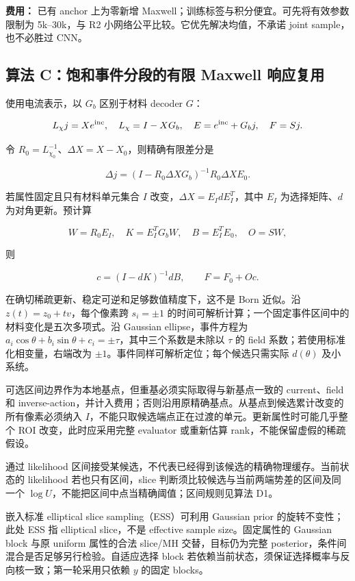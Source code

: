 \documentclass[
  11pt,
  a4paper,
]{article}
\begin{document}
\textbf{费用：} 已有 anchor 上为零新增
Maxwell；训练标签与积分便宜。可先将有效参数限制为 5k--30k，与 R2
小网络公平比较。它优先解决均值，不承诺 joint sample，也不必胜过 CNN。

\hypertarget{ux7b97ux6cd5-cux9971ux548cux4e8bux4ef6ux5206ux6bb5ux7684ux6709ux9650-maxwell-ux54cdux5e94ux590dux7528}{%
\subsection{算法 C：饱和事件分段的有限 Maxwell
响应复用}\label{ux7b97ux6cd5-cux9971ux548cux4e8bux4ef6ux5206ux6bb5ux7684ux6709ux9650-maxwell-ux54cdux5e94ux590dux7528}}

使用电流表示，以 \(G_b\) 区别于材料 decoder \(G\)：

\[L_\chi j=Xe^{\rm inc},\quad L_\chi=I-XG_b,
\quad E=e^{\rm inc}+G_bj,\quad F=Sj.\]

令 \(R_0=L_{\chi_0}^{-1}\)、\(\Delta X=X-X_0\)，则精确有限差分是

\[\Delta j=(I-R_0\Delta XG_b)^{-1}R_0\Delta X E_0.\]

若属性固定且只有材料单元集合 \(I\) 改变，\(\Delta X=E_I dE_I^T\)，其中
\(E_I\) 为选择矩阵、\(d\) 为对角更新。预计算

\[W=R_0E_I,\quad K=E_I^TG_bW,\quad B=E_I^TE_0,\quad O=SW,\]

则

\[c=(I-dK)^{-1}dB,\qquad F=F_0+Oc.\]

在确切稀疏更新、稳定可逆和足够数值精度下，这不是 Born 近似。沿
\(z(t)=z_0+tv\)，每个像素跨 \(s_i=\pm1\)
的时间可解析计算；一个固定事件区间中的材料变化是五次多项式。沿 Gaussian
ellipse，事件方程为
\(a_i\cos\theta+b_i\sin\theta+c_i=\pm\tau\)，其中三个系数是未除以
\(\tau\) 的 field 系数；若使用标准化相变量，右端改为
\(\pm1\)。事件同样可解析定位；每个候选只需实际 \(d(\theta)\) 及小系统。

可选区间边界作为本地基点，但重基必须实际取得与新基点一致的
current、field 和
inverse-action，并计入费用；否则沿用原精确基点。从基点到候选累计改变的所有像素必须纳入
\(I\)，不能只取候选端点正在过渡的单元。更新属性时可能几乎整个 ROI
改变，此时应采用完整 evaluator 或重新估算 rank，不能保留虚假的稀疏假设。

通过 likelihood
区间接受某候选，不代表已经得到该候选的精确物理缓存。当前状态的
likelihood 若也只有区间，slice
判断须比较候选与当前两端势差的区间及同一个
\(\log U\)，不能把区间中点当精确阈值；区间规则见算法 D1。

嵌入标准 elliptical slice sampling（ESS）可利用 Gaussian prior
的旋转不变性；此处 ESS 指 elliptical slice，不是 effective sample
size。固定属性的 Gaussian block 与原 uniform 属性的合法 slice/MH
交替，目标仍为完整 posterior，条件间混合是否足够另行检验。自适应选择
block 若依赖当前状态，须保证选择概率与反向核一致；第一轮采用只依赖 \(y\)
的固定 blocks。
\end{document}
